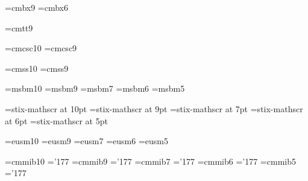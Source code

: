 \font\ninebf=cmbx9
\font\sixbf=cmbx6

\font\ninett=cmtt9

\font\tensc=cmcsc10
\font\ninesc=cmcsc9

\font\tenss=cmss10
\font\niness=cmss9

\font\tenbb=msbm10
\font\ninebb=msbm9
\font\sevenbb=msbm7
\font\sixbb=msbm6
\font\fivebb=msbm5

\font\tenscr=stix-mathscr at 10pt
\font\ninescr=stix-mathscr at 9pt
\font\sevenscr=stix-mathscr at 7pt
\font\sixscr=stix-mathscr at 6pt
\font\fivescr=stix-mathscr at 5pt

\font\teneucal=eusm10
\font\nineeucal=eusm9
\font\seveneucal=eusm7
\font\sixeucal=eusm6
\font\fiveeucal=eusm5

\font\tenbmit=cmmib10  \skewchar\tenbmit='177
\font\ninebmit=cmmib9  \skewchar\ninebmit='177
\font\sevenbmit=cmmib7 \skewchar\sevenbmit='177
\font\sixbmit=cmmib6   \skewchar\sixbmit='177
\font\fivebmit=cmmib5  \skewchar\fivebmit='177

\newfam\scfam
\newfam\ssfam
\newfam\bbfam
\newfam\scrfam
\newfam\eucalfam
\newfam\bmitfam

\def\initfam#1#2#3#4{%
	\textfont#1=#2%
	\scriptfont#1=#3%
	\scriptscriptfont#1=#4}

\def\bb{\fam=\bbfam}
\def\scr{\fam=\scrfam}
\def\eucal{\fam=\eucalfam}
\def\bmit{\fam=\bmitfam}

\def\tenpt{%
	\initfam0\tenrm\sevenrm\fiverm
	\initfam1\teni\seveni\fivei
	\initfam2\tensy\sevensy\fivesy
	\initfam\itfam\tenit\nullfont\nullfont
	\initfam\slfam\tensl\nullfont\nullfont
	\initfam\bffam\tenbf\sevenbf\fivebf
	\initfam\ttfam\tentt\nullfont\nullfont
	\initfam\scfam\tensc\nullfont\nullfont
	\initfam\ssfam\tenss\nullfont\nullfont
	\initfam\bbfam\tenbb\sevenbb\fivebb
	\initfam\scrfam\tenscr\sevenscr\fivescr
	\initfam\eucalfam\teneucal\seveneucal\fiveeucal
	\initfam\bmitfam\tenbmit\sevenbmit\fivebmit
	\def\rm{\fam=0      \tenrm}%
	\def\it{\fam=\itfam \tenit}%
	\def\sl{\fam=\slfam \tensl}%
	\def\bf{\fam=\bffam \tenbf}%
	\def\tt{\fam=\ttfam \tentt}%
	\def\sc{\fam=\scfam \tensc}%
	\def\ss{\fam=\ssfam \tenss}%
	\setbox\strutbox=\hbox{\vrule height8.5pt depth3.5pt width0pt}%
	\normalbaselineskip=12pt
	\normalbaselines\rm}

